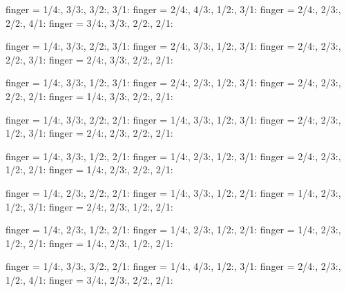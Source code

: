 \documentclass[../main.tex]{subfiles}
\begin{document}

  {finger = {1/4:\R, 3/3:, 3/2:, 3/1:}}
  {finger = {2/4:, 4/3:, 1/2:\R, 3/1:}}
  {finger = {2/4:, 2/3:\R, 2/2:, 4/1:}}
  {finger = {3/4:, 3/3:, 2/2:, 2/1:\R}}

  {finger = {1/4:\R, 3/3:, 2/2:, 3/1:}}
  {finger = {2/4:, 3/3:, 1/2:\R, 3/1:}}
  {finger = {2/4:, 2/3:\R, 2/2:, 3/1:}}
  {finger = {2/4:, 3/3:, 2/2:, 2/1:\R}}

  {finger = {1/4:\R, 3/3:, 1/2:, 3/1:}}
  {finger = {2/4:, 2/3:, 1/2:\R, 3/1:}}
  {finger = {2/4:, 2/3:\R, 2/2:, 2/1:}}
  {finger = {1/4:, 3/3:, 2/2:, 2/1:\R}}

  {finger = {1/4:\R, 3/3:, 2/2:, 2/1:}}
  {finger = {1/4:, 3/3:, 1/2:\R, 3/1:}}
  {finger = {2/4:, 2/3:\R, 1/2:, 3/1:}}
  {finger = {2/4:, 2/3:, 2/2:, 2/1:\R}}


  {finger = {1/4:\R, 3/3:, 1/2:, 2/1:}}
  {finger = {1/4:, 2/3:, 1/2:\R, 3/1:}}
  {finger = {2/4:, 2/3:\R, 1/2:, 2/1:}}
  {finger = {1/4:, 2/3:, 2/2:, 2/1:\R}}

  {finger = {1/4:\R, 2/3:, 2/2:, 2/1:}}
  {finger = {1/4:, 3/3:, 1/2:\R, 2/1:}}
  {finger = {1/4:, 2/3:\R, 1/2:, 3/1:}}
  {finger = {2/4:, 2/3:, 1/2:, 2/1:\R}}


  {finger = {1/4:\R, 2/3:, 1/2:, 2/1:}}
  {finger = {1/4:, 2/3:, 1/2:\R, 2/1:}}
  {finger = {1/4:, 2/3:\R, 1/2:, 2/1:}}
  {finger = {1/4:, 2/3:, 1/2:, 2/1:\R}}

  {finger = {1/4:\R, 3/3:, 3/2:, 2/1:}}
  {finger = {1/4:, 4/3:, 1/2:\R, 3/1:}}
  {finger = {2/4:, 2/3:\R, 1/2:, 4/1:}}
  {finger = {3/4:, 2/3:, 2/2:, 2/1:\R}}
\end{document}
